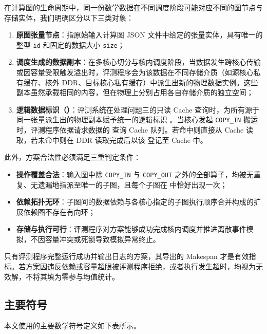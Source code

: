 \documentclass[anonymous,withtoc]{gmcm2026}
\providecommand{\tightlist}{\setlength{\itemsep}{0pt}\setlength{\parskip}{0pt}}
\begin{document}
在计算图的生命周期中，同一份数学数据在不同调度阶段可能对应不同的图节点与存储实体，我们明确区分以下三类对象：

\begin{enumerate}
\def\labelenumi{\arabic{enumi}.}
\tightlist
\item
  \textbf{原图张量节点}：指原始输入计算图 JSON 文件中给定的张量实体，具有唯一的整型 \texttt{id} 和固定的数据大小 \texttt{size}；
\item
  \textbf{调度生成的数据副本}：在多核心切分与核内调度阶段，当数据发生跨核心传输或因容量受限触发溢出时，评测程序会为该数据在不同存储介质（如源核心私有缓存、核外 DDR、目标核心私有缓存）中派生出新的物理数据实例。这些副本虽然承载相同的内容，但在物理上分别占用各自存储介质的独立空间；
\item
  \textbf{逻辑数据标识（\texttt{}）}：评测系统在处理问题三的只读 Cache 查询时，为所有源于同一张量派生出的物理副本赋予统一的逻辑标识 \texttt{}。当核心发起 \texttt{COPY\_IN} 搬运时，评测程序依据请求数据的 \texttt{} 查询 Cache 队列。若命中则直接从 Cache 读取，若未命中则在 DDR 读取完成后以该 \texttt{} 登记至 Cache 中。
\end{enumerate}

此外，方案合法性必须满足三重判定条件：

\begin{itemize}
\tightlist
\item
  \textbf{操作覆盖合法}：输入图中除 \texttt{COPY\_IN} 与 \texttt{COPY\_OUT} 之外的全部算子，均被无重复、无遗漏地指派至唯一的子图，且每个子图在 \texttt{} 中恰好出现一次；
\item
  \textbf{依赖拓扑无环}：子图间的数据依赖与各核心指定的子图执行顺序合并构成的扩展依赖图不存在有向环；
\item
  \textbf{存储与执行可行}：评测程序对方案能够成功完成核内调度并推进离散事件模拟，不因容量冲突或死锁导致模拟异常终止。
\end{itemize}

只有评测程序完整运行成功并输出日志的方案，其导出的 Makespan 才是有效指标。若方案因违反依赖或容量超限被评测程序拒绝，或者执行发生超时，均视为无效解，不将其填为零参与均值统计。

\subsection{主要符号}

本文使用的主要数学符号定义如下表所示。
\end{document}
